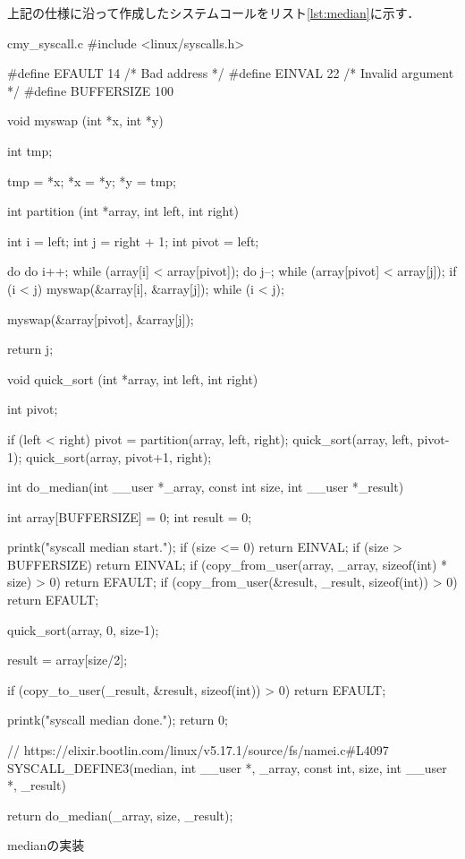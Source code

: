 上記の仕様に沿って作成したシステムコールをリスト\ref{lst:median}に示す．
\begin{longlisting}
\begin{myminted}{c}{my_syscall.c}
#include <linux/syscalls.h>

#define	EFAULT 14	/* Bad address */
#define	EINVAL 22	/* Invalid argument */
#define BUFFERSIZE 100

void myswap (int *x, int *y) {
    int tmp;

    tmp = *x;
    *x = *y;
    *y = tmp;
}

int partition (int *array, int left, int right) {
    int i = left;
    int j = right + 1;
    int pivot = left;

    do {
        do { i++; } while (array[i] < array[pivot]);
        do { j--; } while (array[pivot] < array[j]);
        if (i < j) { myswap(&array[i], &array[j]); }
    } while (i < j);

    myswap(&array[pivot], &array[j]);

    return j;
}

void quick_sort (int *array, int left, int right) {
    int pivot;

    if (left < right) {
        pivot = partition(array, left, right);
        quick_sort(array, left, pivot-1);
        quick_sort(array, pivot+1, right);
    }
}

int do_median(int __user *_array, const int size, int __user *_result) {
    int array[BUFFERSIZE] = {0};
    int result = 0;

    printk("syscall median start.");
    if (size <= 0) return EINVAL;
    if (size > BUFFERSIZE) return EINVAL;
    if (copy_from_user(array, _array, sizeof(int) * size) > 0) return EFAULT;
    if (copy_from_user(&result, _result, sizeof(int)) > 0) return EFAULT;

    quick_sort(array, 0, size-1);

    result = array[size/2];

    if (copy_to_user(_result, &result, sizeof(int)) > 0) return EFAULT;
    
    printk("syscall median done.");
    return 0;
}

// https://elixir.bootlin.com/linux/v5.17.1/source/fs/namei.c#L4097
SYSCALL_DEFINE3(median,
        int __user *, _array,
        const int, size,
        int __user *, _result) {

    return do_median(_array, size, _result);
}
\end{myminted}
\caption{medianの実装}
\label{lst:median}
\end{longlisting}

